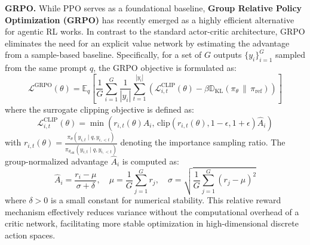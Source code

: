 \documentclass{llmxive}
\begin{document}
\textbf{GRPO.} While PPO serves as a foundational baseline, \textbf{Group Relative Policy Optimization (GRPO)} \cite{GRPO} has recently emerged as a highly efficient alternative for agentic RL works. In contrast to the standard actor-critic architecture, GRPO eliminates the need for an explicit value network by estimating the advantage from a sample-based baseline. Specifically, for a set of $G$ outputs $\{y_i\}_{i=1}^G$ sampled from the same prompt $q$, the GRPO objective is formulated as:
\begin{equation}
\mathcal{L}^{\text{GRPO}}(\theta) = \mathbb{E}_{q} \left[ \frac{1}{G} \sum_{i=1}^G \frac{1}{|y_i|} \sum_{t=1}^{|y_i|}\left( \mathcal{L}_{i,t}^{\text{CLIP}}(\theta) - \beta \mathbb{D}_{\text{KL}}(\pi_\theta \,\|\, \pi_{\text{ref}}) \right) \right]
\end{equation}
where the surrogate clipping objective is defined as: \begin{equation} \mathcal{L}_{i,t}^{\text{CLIP}}(\theta) = \min \left( r_{i,t}(\theta) \hat{A}_i, \, \text{clip}(r_{i,t}(\theta), 1-\epsilon, 1+\epsilon) \hat{A}_i \right) 
\end{equation}
with $r_{i,t}(\theta) = \frac{\pi_\theta(y_{i,t} \mid q, y_{i, < t})}{\pi_{\theta_{\text{old}}}(y_{i,t} \mid q, y_{i, < t})}$ denoting the importance sampling ratio.
The group-normalized advantage $\hat{A}_i$ is computed as:
\begin{equation}
\hat{A}_i = \frac{r_i - \mu}{\sigma + \delta}, \quad \mu = \frac{1}{G}\sum_{j=1}^G r_j, \quad \sigma = \sqrt{\frac{1}{G}\sum_{j=1}^G (r_j - \mu)^2}
\end{equation}
where $\delta > 0$ is a small constant for numerical stability. This relative reward mechanism effectively reduces variance without the computational overhead of a critic network, facilitating more stable optimization in high-dimensional discrete action spaces.
\end{document}
